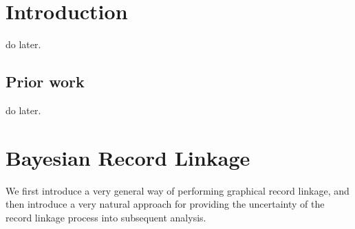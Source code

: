 \documentclass[twoside]{article}
\begin{document}
%

%



%
\onecolumn
\begin{abstract}

 
\end{abstract}

\section{Introduction}
do later. 

\subsection{Prior work}
do later. 

\section{Bayesian Record Linkage}
\label{sec:linkage}
We first introduce a very general way of performing graphical record linkage, and then introduce a very natural approach 
for providing the uncertainty of the record linkage process into subsequent analysis. 
\end{document}
